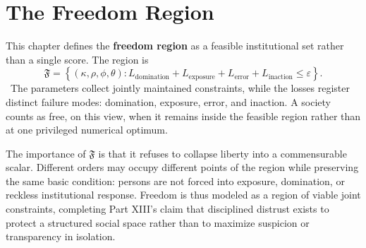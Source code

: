 
\chapter{The Freedom Region}
\label{ch:ch076}

This chapter defines the \textbf{freedom region} as a feasible institutional set rather than a single score. The region is
\[
\mathfrak F
=
\left\{
(\kappa,\rho,\phi,\theta):
L_{\mathrm{domination}}
+
L_{\mathrm{exposure}}
+
L_{\mathrm{error}}
+
L_{\mathrm{inaction}}
\leq \varepsilon
\right\}.
\]
\ToyModel\ The parameters collect jointly maintained constraints, while the losses register distinct failure modes: domination, exposure, error, and inaction. A society counts as free, on this view, when it remains inside the feasible region rather than at one privileged numerical optimum.

The importance of \(\mathfrak F\) is that it refuses to collapse liberty into a commensurable scalar. Different orders may occupy different points of the region while preserving the same basic condition: persons are not forced into exposure, domination, or reckless institutional response. Freedom is thus modeled as a region of viable joint constraints, completing Part XIII's claim that disciplined distrust exists to protect a structured social space rather than to maximize suspicion or transparency in isolation.
